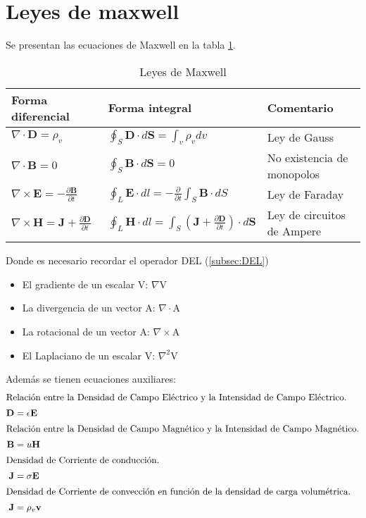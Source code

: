 \documentclass[12pt,fleqn,a4paper,]{LegrandOrangeBook}
\begin{document}
\section{Leyes de maxwell}
Se presentan las ecuaciones de Maxwell en la tabla \ref{tab:maxwell}.
\begin{table}[]
\begin{tabular}{|l|l|l|}
\hline
\rowcolor[HTML]{0066cc} 
Forma diferencial & Forma integral                                                                 & Comentario\\ \hline
$\nabla\cdot \textbf{D}=\rho_v$  & $\oint_S\textbf{D}\cdot d\textbf{S}=\int_v\rho_vdv                                 $ & Ley de Gauss\\ \hline
$\nabla\cdot \textbf{B}=0$ & $\oint_S\textbf{B}\cdot d\textbf{S}=0
$ & No existencia de monopolos \\ \hline
$\nabla\times \textbf{E}=-\frac{\partial \textbf{B}}{\partial t}$    & $\oint_L\textbf{E}\cdot dl=-\frac{\partial}{\partial t}\int_S\textbf{B}\cdot dS
$ & Ley de Faraday\\ \hline
$\nabla\times \textbf{H}=\textbf{J} + \frac{\partial \textbf{D}}{\partial t}$ & $\oint_L\textbf{H}\cdot dl=\int_S\left(\textbf{J} + \frac{\partial \textbf{D}}{\partial t}\right)\cdot d\textbf{S}$ & Ley de circuitos de Ampere \\ \hline
\end{tabular}
\caption{Leyes de Maxwell}
\label{tab:maxwell}
\end{table}
Donde es necesario recordar el operador DEL (\ref{subsec:DEL})
\begin{itemize}
\item El gradiente de un escalar V: $\nabla$V
\item La divergencia de un vector A: $\nabla\cdot$A
\item La rotacional de un vector A: $\nabla\times$A
\item El Laplaciano de un escalar V: $\nabla^2$V
\end{itemize}
Además se tienen ecuaciones auxiliares:
\begin{subequations}
\begin{align}
\intertext{Relación entre la Densidad de Campo Eléctrico y la Intensidad de Campo Eléctrico.}
\textbf{D}&= \epsilon \textbf{E}\\
\intertext{Relación entre la Densidad de Campo Magnético y la Intensidad de Campo Magnético.}
\textbf{B}&=u\textbf{H}\\
\intertext{Densidad de Corriente de conducción.}
\textbf{J}&=\sigma\textbf{E}\\
\intertext{Densidad de Corriente de convección en función de la densidad de carga volumétrica.}
\textbf{J}&=\rho_v\textbf{v}
\end{align}
\end{subequations}
\end{document}
